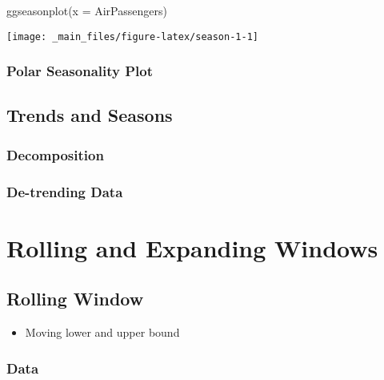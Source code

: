 \documentclass[
]{book}
\newenvironment{Shaded}{\begin{snugshade}}{\end{snugshade}}
\newcommand{\AttributeTok}[1]{\textcolor[rgb]{0.77,0.63,0.00}{#1}}
\newcommand{\FunctionTok}[1]{\textcolor[rgb]{0.00,0.00,0.00}{#1}}
\newcommand{\NormalTok}[1]{#1}
\providecommand{\tightlist}{%
  \setlength{\itemsep}{0pt}\setlength{\parskip}{0pt}}
\begin{document}
\begin{Shaded}
\begin{Highlighting}[]
\FunctionTok{ggseasonplot}\NormalTok{(}\AttributeTok{x =}\NormalTok{ AirPassengers)}
\end{Highlighting}
\end{Shaded}

\begin{center}\texttt{[image: \_main\_files/figure-latex/season-1-1]} \end{center}

\hypertarget{polar-seasonality-plot}{%
\subsection{Polar Seasonality Plot}\label{polar-seasonality-plot}}

\hypertarget{trends-and-seasons}{%
\section{Trends and Seasons}\label{trends-and-seasons}}

\hypertarget{decomposition}{%
\subsection{Decomposition}\label{decomposition}}

\hypertarget{de-trending-data}{%
\subsection{De-trending Data}\label{de-trending-data}}

\hypertarget{rolling-and-expanding-windows}{%
\chapter{Rolling and Expanding Windows}\label{rolling-and-expanding-windows}}

\hypertarget{rolling-window}{%
\section{Rolling Window}\label{rolling-window}}

\begin{itemize}
\tightlist
\item
  Moving lower and upper bound
\end{itemize}

\hypertarget{data}{%
\subsection{Data}\label{data}}
\end{document}
